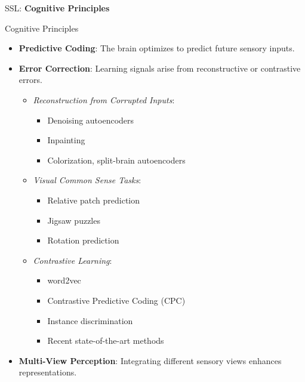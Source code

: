 \begin{frame}{}
    \LARGE SSL: \textbf{Cognitive Principles}
\end{frame}

\begin{frame}[t,allowframebreaks]{Cognitive Principles}
\begin{itemize}
    \item \textbf{Predictive Coding}: The brain optimizes to predict future sensory inputs.
    \item \textbf{Error Correction}: Learning signals arise from reconstructive or contrastive errors.
    \begin{itemize}
        \item \textit{Reconstruction from Corrupted Inputs}:
        \begin{itemize}
            \item Denoising autoencoders
            \item Inpainting
            \item Colorization, split-brain autoencoders
        \end{itemize}
        \item \textit{Visual Common Sense Tasks}:
        \begin{itemize}
            \item Relative patch prediction
            \item Jigsaw puzzles
            \item Rotation prediction
        \end{itemize}
        \item \textit{Contrastive Learning}:
        \begin{itemize}
            \item word2vec
            \item Contrastive Predictive Coding (CPC)
            \item Instance discrimination
            \item Recent state-of-the-art methods
        \end{itemize}
    \end{itemize}
    \item \textbf{Multi-View Perception}: Integrating different sensory views enhances representations.
\end{itemize}
\end{frame}